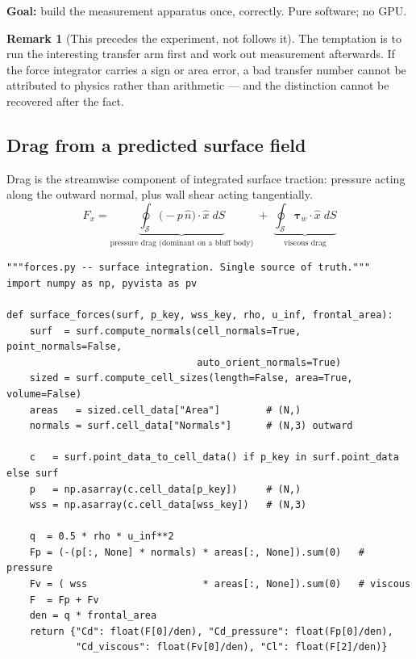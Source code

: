 \documentclass[10pt,a4paper]{article}
\theoremstyle{definition}
\newtheorem{remark}{Remark}[section]
\newcommand{\calS}{\mathcal{S}}
\begin{document}
\textbf{Goal:} build the measurement apparatus once, correctly. Pure software; no
GPU.

\begin{remark}[This precedes the experiment, not follows it]
The temptation is to run the interesting transfer arm first and work out
measurement afterwards. If the force integrator carries a sign or area error, a bad
transfer number cannot be attributed to physics rather than arithmetic --- and the
distinction cannot be recovered after the fact.
\end{remark}

\subsection{Drag from a predicted surface field}

Drag is the streamwise component of integrated surface traction: pressure acting
along the outward normal, plus wall shear acting tangentially.
\begin{equation}
F_x = \underbrace{\oint_{\calS} \bigl(-p\,\hat{n}\bigr)\cdot\hat{x}\;dS}
        _{\text{pressure drag (dominant on a bluff body)}}
    \;+\;
      \underbrace{\oint_{\calS} \boldsymbol{\tau}_w\cdot\hat{x}\;dS}
        _{\text{viscous drag}}
\label{eq:forces}
\end{equation}

\begin{lstlisting}
"""forces.py -- surface integration. Single source of truth."""
import numpy as np, pyvista as pv

def surface_forces(surf, p_key, wss_key, rho, u_inf, frontal_area):
    surf  = surf.compute_normals(cell_normals=True, point_normals=False,
                                 auto_orient_normals=True)
    sized = surf.compute_cell_sizes(length=False, area=True, volume=False)
    areas   = sized.cell_data["Area"]        # (N,)
    normals = surf.cell_data["Normals"]      # (N,3) outward

    c   = surf.point_data_to_cell_data() if p_key in surf.point_data else surf
    p   = np.asarray(c.cell_data[p_key])     # (N,)
    wss = np.asarray(c.cell_data[wss_key])   # (N,3)

    q  = 0.5 * rho * u_inf**2
    Fp = (-(p[:, None] * normals) * areas[:, None]).sum(0)   # pressure
    Fv = ( wss                    * areas[:, None]).sum(0)   # viscous
    F  = Fp + Fv
    den = q * frontal_area
    return {"Cd": float(F[0]/den), "Cd_pressure": float(Fp[0]/den),
            "Cd_viscous": float(Fv[0]/den), "Cl": float(F[2]/den)}
\end{lstlisting}
\end{document}
